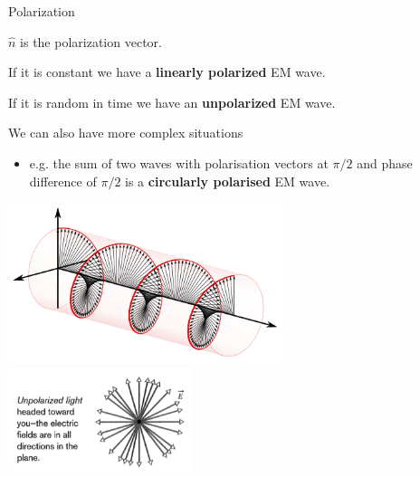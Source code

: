 \begin{frame}{Polarization}

$\hat{n}$ is the polarization vector.\\
\vspace{0.2cm}
\begin{itemize}
{\small
\item
If it is constant we have a {\bf linearly polarized} EM  wave.
\item
If it is random in time we have an {\bf unpolarized} EM wave.
\item
We can also have more complex situations
  \begin{itemize}
        \item e.g. the sum of two waves with polarisation vectors at $\pi/2$ and phase
                  difference of $\pi/2$ is a {\bf circularly polarised} EM wave.
  \end{itemize}
}
\end{itemize}

\begin{center}
    \includegraphics[width=0.60\textwidth]{./images/schematics/wave_circular_polarization.png}
    \includegraphics[width=0.40\textwidth]{./images/schematics/unpolarised_light_heading_towards_you.png}
\end{center}

\end{frame}

%
%
%

